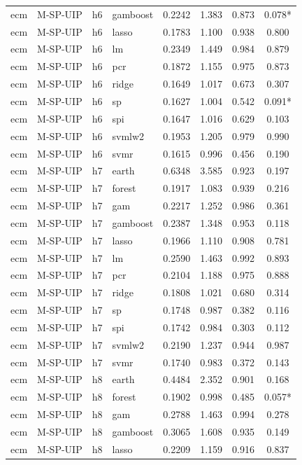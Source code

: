 \begin{ThreePartTable}
\begin{longtable}[t]{llclcccc}
ecm & M-SP-UIP & h6 & gamboost & 0.2242 & 1.383 & 0.873 & 0.078*\\
ecm & M-SP-UIP & h6 & lasso & 0.1783 & 1.100 & 0.938 & 0.800\\
ecm & M-SP-UIP & h6 & lm & 0.2349 & 1.449 & 0.984 & 0.879\\
ecm & M-SP-UIP & h6 & pcr & 0.1872 & 1.155 & 0.975 & 0.873\\
ecm & M-SP-UIP & h6 & ridge & 0.1649 & 1.017 & 0.673 & 0.307\\
ecm & M-SP-UIP & h6 & sp & 0.1627 & 1.004 & 0.542 & 0.091*\\
ecm & M-SP-UIP & h6 & spi & 0.1647 & 1.016 & 0.629 & 0.103\\
ecm & M-SP-UIP & h6 & svmlw2 & 0.1953 & 1.205 & 0.979 & 0.990\\
ecm & M-SP-UIP & h6 & svmr & 0.1615 & 0.996 & 0.456 & 0.190\\
\addlinespace
ecm & M-SP-UIP & h7 & earth & 0.6348 & 3.585 & 0.923 & 0.197\\
ecm & M-SP-UIP & h7 & forest & 0.1917 & 1.083 & 0.939 & 0.216\\
ecm & M-SP-UIP & h7 & gam & 0.2217 & 1.252 & 0.986 & 0.361\\
ecm & M-SP-UIP & h7 & gamboost & 0.2387 & 1.348 & 0.953 & 0.118\\
ecm & M-SP-UIP & h7 & lasso & 0.1966 & 1.110 & 0.908 & 0.781\\
ecm & M-SP-UIP & h7 & lm & 0.2590 & 1.463 & 0.992 & 0.893\\
ecm & M-SP-UIP & h7 & pcr & 0.2104 & 1.188 & 0.975 & 0.888\\
ecm & M-SP-UIP & h7 & ridge & 0.1808 & 1.021 & 0.680 & 0.314\\
ecm & M-SP-UIP & h7 & sp & 0.1748 & 0.987 & 0.382 & 0.116\\
ecm & M-SP-UIP & h7 & spi & 0.1742 & 0.984 & 0.303 & 0.112\\
ecm & M-SP-UIP & h7 & svmlw2 & 0.2190 & 1.237 & 0.944 & 0.987\\
ecm & M-SP-UIP & h7 & svmr & 0.1740 & 0.983 & 0.372 & 0.143\\
\addlinespace
ecm & M-SP-UIP & h8 & earth & 0.4484 & 2.352 & 0.901 & 0.168\\
ecm & M-SP-UIP & h8 & forest & 0.1902 & 0.998 & 0.485 & 0.057*\\
ecm & M-SP-UIP & h8 & gam & 0.2788 & 1.463 & 0.994 & 0.278\\
ecm & M-SP-UIP & h8 & gamboost & 0.3065 & 1.608 & 0.935 & 0.149\\
ecm & M-SP-UIP & h8 & lasso & 0.2209 & 1.159 & 0.916 & 0.837\\

\end{longtable}
\end{ThreePartTable}
